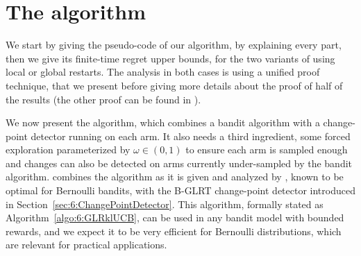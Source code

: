 \section{The \GLRklUCB{} algorithm}
\label{sec:6:GLRklUCB_Algorithm}

We start by giving the pseudo-code of our algorithm, by explaining every part, then we give its finite-time regret upper bounds, for the two variants of using local or global restarts.
The analysis in both cases is using a unified proof technique, that we present before giving more details about the proof of half of the results (the other proof can be found in \cite{Besson2019GLRT}).



We now present the \GLRklUCB{} algorithm, which combines a bandit algorithm with a change-point detector running on each arm.
It also needs a third ingredient, some forced exploration parameterized by $\omega\in(0,1)$ to ensure each arm is sampled enough and changes can also be detected on arms currently under-sampled by the bandit algorithm.
%
\GLRklUCB{} combines the \klUCB{} algorithm as it is given and analyzed by \cite{KLUCBJournal}, known to be optimal for Bernoulli bandits, with the B-GLRT change-point detector introduced in Section~\ref{sec:6:ChangePointDetector}.
%
This algorithm, formally stated as Algorithm~\ref{algo:6:GLRklUCB}, can be used in any bandit model with bounded rewards, and we expect it to be very efficient for Bernoulli distributions, which are relevant for practical applications.

